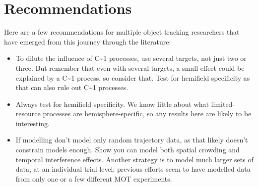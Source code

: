 \documentclass[
]{book}
\providecommand{\tightlist}{%
  \setlength{\itemsep}{0pt}\setlength{\parskip}{0pt}}
\begin{document}
\hypertarget{recommendations}{%
\section{Recommendations}\label{recommendations}}

Here are a few recommendations for multiple object tracking researchers that have emerged from this journey through the literature:

\begin{itemize}
\item
  To dilute the influence of C\textasciitilde1 processes, use several targets, not just two or three. But remember that even with several targets, a small effect could be explained by a C\textasciitilde1 process, so consider that. Test for hemifield specificity as that can also rule out C\textasciitilde1 processes.
\item
  Always test for hemifield specificity. We know little about what limited-resource processes are hemisphere-specific, so any results here are likely to be interesting.
\end{itemize}

\begin{itemize}
\tightlist
\item
  If modelling don't model only random trajectory data, as that likely doesn't constrain models enough. Show you can model both spatial crowding and temporal interference effects. Another strategy is to model much larger sets of data, at an individual trial level; previous efforts seem to have modelled data from only one or a few different MOT experiments.
\end{itemize}

  
\end{document}
